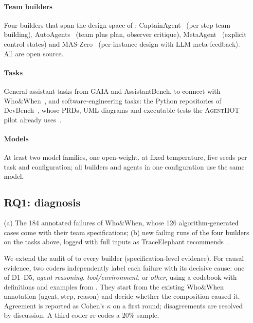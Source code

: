 \documentclass[10pt,a4paper]{article}
\newcommand{\tool}{\textsc{AgentHOT}}
\newcommand{\D}[1]{\textsf{D#1}}
\newcommand{\what}[1]{\par\smallskip\noindent{\sffamily\bfseries\color{accent}#1}\quad}
\begin{document}
\paragraph{Team builders} Four builders that span the design space of
: CaptainAgent~\cite{song2024captain} (per-step team
building), AutoAgents~\cite{chen2024autoagents} (team plus plan, observer
critique), MetaAgent~\cite{zhang2025metaagent} (explicit control states)
and MAS-Zero~\cite{ke2025maszero} (per-instance design with LLM
meta-feedback). All are open source.

\paragraph{Tasks} General-assistant tasks from GAIA and AssistantBench, to
connect with Who\&When~\cite{zhang2025whowhen}, and software-engineering
tasks: the Python repositories of DevBench~\cite{li2024devbench}, whose
PRDs, UML diagrams and executable tests the \tool{} pilot already
uses~\cite{agenthot2026}.

\paragraph{Models} At least two model families, one open-weight, at fixed
temperature, five seeds per task and configuration; all builders and
agents in one configuration use the same model.

\subsection{RQ1: diagnosis}\label{sec:plan-rq1}

\what{Data.} (a) The 184 annotated failures of Who\&When, whose 126
algorithm-generated cases come with their team specifications; (b) new
failing runs of the four builders on the tasks above, logged with full
inputs as TraceElephant recommends~\cite{chen2026traceelephant}.

\what{Procedure.} We extend the audit of  to every builder
(specification-level evidence). For causal evidence, two coders
independently label each failure with its decisive cause: one of
\D{1}--\D{5}, \emph{agent reasoning}, \emph{tool/environment}, or
\emph{other}, using a codebook with definitions and examples from
. They start from the existing Who\&When annotation (agent,
step, reason) and decide whether the composition caused it. Agreement is
reported as Cohen's $\kappa$ on a first round; disagreements are resolved
by discussion. A third coder re-codes a 20\% sample.
\end{document}
